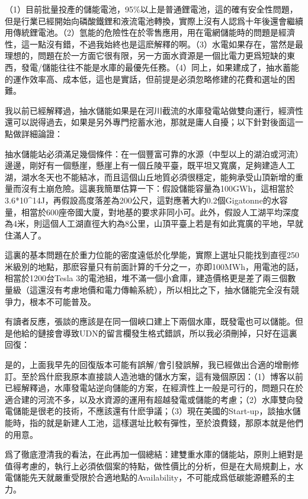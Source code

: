 \documentclass[twocolumn]{ctexart}
\begin{document}
（1）目前批量投產的儲能電池，95\%以上是普通鋰電池，這的確有安全性問題，但是行業已經開始向磷酸鐵鋰和液流電池轉換，實際上沒有人認爲十年後還會繼續用傳統鋰電池。（2）氫能的危險性在於零售應用，用在電網儲能時的問題是經濟性，這一點沒有錯，不過我始終也是這麽解釋的啊。（3）水電如果存在，當然是最理想的，問題在於一方面它很有限，另一方面水資源是一個比電力更爲短缺的東西，發電/儲能往往不能是水庫的最優先任務。（4）同上，如果建成了，抽水蓄能的運作效率高、成本低，這也是實話，但前提是必須忽略修建的花費和選址的困難。

我以前已經解釋過，抽水儲能如果是在河川截流的水庫發電站做雙向運行，經濟性還可以説得過去，如果是另外專門挖蓄水池，那就是庸人自擾；以下針對後面這一點做詳細論證：

抽水儲能站必須滿足幾個條件：在一個豐富可靠的水源（中型以上的湖泊或河流）邊邊，剛好有一個懸崖，懸崖上有一個丘陵平臺，既平坦又寬廣，足夠建造人工湖，湖水冬天也不能結冰，而且這個山丘地質必須很穩定，能夠承受山頂新增的重量而沒有土崩危險。這裏我簡單估算一下：假設儲能容量為100GWh，這相當於3.6*10\^{}14J，再假設高度落差為200公尺，這對應著大約0.2個Gigatonne的水容量，相當於600座帝國大廈，對地基的要求非同小可。此外，假設人工湖平均深度為4米，則這個人工湖直徑大約為8公里，山頂平臺上若是有如此寬廣的平地，早就住滿人了。

這裏的基本問題在於重力位能的密度遠低於化學能，實際上選址只能找到直徑250米級別的地點，那麽容量只有前面計算的千分之一，亦即100MWh，用電池的話，相當於1200台Tesla 3的電池組，堆不滿一個小倉庫，建造價格更是差了兩三個數量級（這還沒有考慮地價和電力傳輸系統），所以相比之下，抽水儲能完全沒有競爭力，根本不可能普及。


有讀者反應，張談的應該是在同一個峽口建上下兩個水庫，既發電也可以儲能。但是他給的鏈接會導致UDN的留言欄發生格式錯誤，所以我必須刪掉，只好在這裏回復：

是的，上面我早先的回復版本可能有誤解/會引發誤解，我已經做出合適的增刪修訂。至於爲什麽我原本直接談人造池塘的儲水方案，這有幾個原因：（1）博客以前已經解釋過，水庫發電站逆向儲能的方案，在經濟性上一般是可行的，問題只在於適合建的河流不多，以及水資源的運用有超越發電或儲能的考慮；（2）水庫雙向發電儲能是很老的技術，不應該還有什麽爭議；（3）現在美國的Start-up，談抽水儲能時，指的就是新建人工池，這樣選址比較有彈性，至於浪費錢，那原本就是他們的用意。


爲了徹底澄清我的看法，在此再加一個總結：建雙重水庫的儲能站，原則上絕對是值得考慮的，執行上必須依個案的特點，做性價比的分析，但是在大局規劃上，水電儲能先天就嚴重受限於合適地點的Availability，不可能成爲低碳能源體系的主力。
\\
\end{document}

